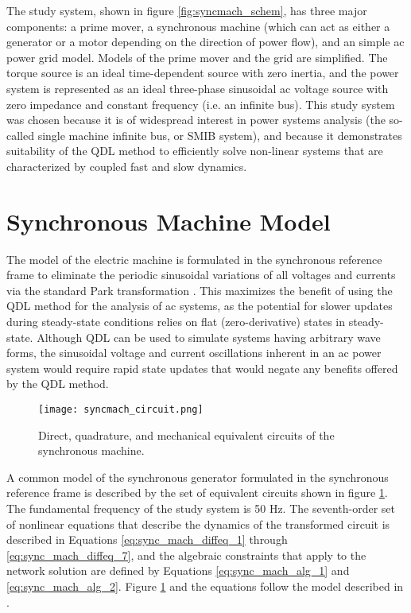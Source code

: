 The study system, shown in figure \ref{fig:syncmach_schem}, has three major components: a prime mover, a synchronous machine (which can act as either a generator or a motor depending on the direction of power flow), and an simple ac power grid model. Models of the prime mover and the grid are simplified. The torque source is an ideal time-dependent source with zero inertia, and the power system is represented as an ideal three-phase sinusoidal ac voltage source with zero impedance and constant frequency (i.e. an infinite bus). This study system was chosen because it is of widespread interest in power systems analysis (the so-called single machine infinite bus, or SMIB system), and because it demonstrates suitability of the QDL method to efficiently solve non-linear systems that are characterized by coupled fast and slow dynamics.

\section{Synchronous Machine Model}

The model of the electric machine is formulated in the synchronous reference frame to eliminate the periodic sinusoidal variations of all voltages and currents via the standard Park transformation \cite{andanapalli2014}. This maximizes the benefit of using the QDL method for the analysis of ac systems, as the potential for slower updates during steady-state conditions relies on flat (zero-derivative) states in steady-state. Although QDL can be used to simulate systems having arbitrary wave forms, the sinusoidal voltage and current oscillations inherent in an ac power system would require rapid state updates that would negate any benefits offered by the QDL method.

\begin{figure}[h]
    \centering
    \texttt{[image: syncmach\_circuit.png]}
    \caption{Direct, quadrature, and mechanical equivalent
        circuits of the synchronous machine.}
    \label{fig:syncmach_circuit}
\end{figure}

A common model of the synchronous generator formulated in the synchronous reference frame is described by the set of equivalent circuits shown in figure \ref{fig:syncmach_circuit}. The fundamental frequency of the study system is 50 Hz. The seventh-order set of nonlinear equations that describe the dynamics of the transformed circuit is described in Equations \ref{eq:sync_mach_diffeq_1} through \ref{eq:sync_mach_diffeq_7}, and the algebraic constraints that apply to the network solution are defined by Equations \ref{eq:sync_mach_alg_1} and \ref{eq:sync_mach_alg_2}. Figure \ref{fig:syncmach_circuit} and the equations follow the model described in \cite{ieee1110}.

